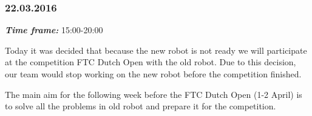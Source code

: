 \subsubsection{22.03.2016}
\textit{\textbf{Time frame:}} 15:00-20:00 

Today it was decided that because the new robot is not ready we will participate at the competition FTC Dutch Open with the old robot. Due to this decision, our team would stop working on the new robot before the competition finished. 

The main aim for the following week before the FTC Dutch Open (1-2 April) is to solve all the problems in old robot and prepare it for the competition.